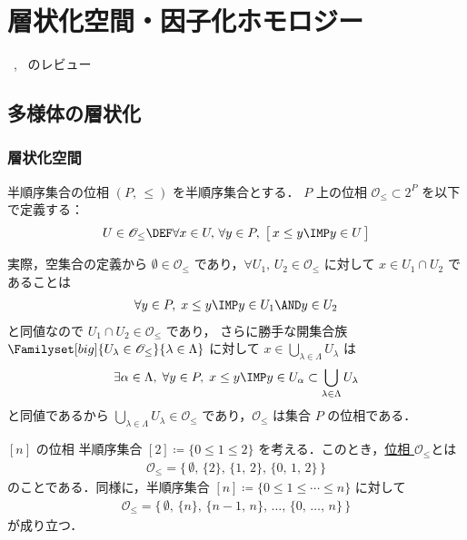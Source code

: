 \documentclass[TQFT_main]{subfiles}
\begin{document}
\chapter{層状化空間・因子化ホモロジー}

~\cite{AFT2014stratified}, ~\cite{AFT2014FH}のレビュー

\section{多様体の層状化}

\subsection{層状化空間}

\begin{mydef}[label=def:topo-poset]{半順序集合の位相}
    $(P,\, \le)$ を半順序集合とする．
    $P$ 上の位相 $\mathscr{O}_{\le} \subset 2^P$ を以下で定義する：
    \begin{align}
        U \in \mathscr{O}_{\le} \DEF \forall x \in U,\, \forall y \in P,\; \bigl[\, x \le y \IMP y \in U \,\bigr]
    \end{align}
\end{mydef}

実際，空集合の定義から $\emptyset \in \mathscr{O}_{\le}$ であり，$\forall U_1,\, U_2 \in \mathcal{O}_{\le}$ に対して $x \in U_1 \cap U_2$ であることは
\begin{align}
     \forall y \in P,\; x \le y \IMP y \in U_1 \AND y \in U_2
\end{align}
と同値なので $U_1 \cap U_2 \in \mathscr{O}_{\le}$ であり，
さらに勝手な開集合族 $\Familyset[big]{U_\lambda \in \mathscr{O}_{\le}}{\lambda \in \Lambda}$ に対して
$x \in \bigcup_{\lambda \in \Lambda} U_\lambda$ は
\begin{align}
    \exists \alpha \in \Lambda,\; \forall y \in P,\; x \le y \IMP y \in U_\alpha \subset \bigcup_{\lambda \in \Lambda} U_\lambda 
\end{align}
と同値であるから $\bigcup_{\lambda \in \Lambda} U_\lambda \in \mathscr{O}_{\le}$ であり，$\mathscr{O}_{\le}$ は集合 $P$ の位相である．

\begin{myexample}[label=ex:topo-poset]{$[n]$ の位相}
    半順序集合 $[2] \coloneqq \{0 \le 1 \le 2\}$ を考える．このとき，\hyperref[def:topo-poset]{位相 $\mathscr{O}_{\le}$}とは
    \begin{align}
        \mathscr{O}_{\le} = \bigl\{\, \emptyset,\, \{2\},\, \{1,\, 2\},\, \{0,\, 1,\, 2\} \,\bigr\} 
    \end{align}
    のことである．同様に，半順序集合 $[n] \coloneqq \{0 \le 1 \le \cdots \le n\}$ に対して
    \begin{align}
        \mathscr{O}_{\le} = \bigl\{\, \emptyset,\, \{n\},\, \{n-1,\, n\},\, \dots,\, \{0,\, \dots,\, n\}  \,\bigr\}
    \end{align}
    が成り立つ．
\end{myexample}
\end{document}

